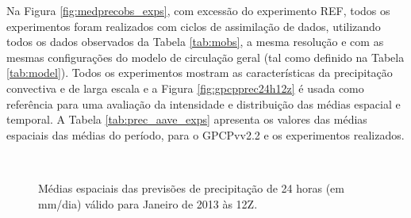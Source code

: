 Na Figura \ref{fig:medprecobs_exps}, com excessão do experimento REF, todos os experimentos foram realizados com ciclos de assimilação de dados, utilizando todos os dados observados da Tabela \ref{tab:mobs}, a mesma resolução e com as mesmas configurações do modelo de circulação geral (tal como definido na Tabela \ref{tab:model}). Todos os experimentos mostram as características da precipitação convectiva e de larga escala e a Figura \ref{fig:gpcpprec24h12z} é usada como referência para uma avaliação da intensidade e distribuição das médias espacial e temporal. A Tabela \ref{tab:prec_aave_exps} apresenta os valores das médias espaciais das médias do período, para o GPCPvv2.2 e os experimentos realizados.

\begin{figure}[H]
    \vspace{-4mm}
    \caption{Médias espaciais das previsões de precipitação de 24 horas (em mm/dia) válido para Janeiro de 2013 às 12Z.}
    \begin{center}
        \\ 
\end{center}
\end{figure}
